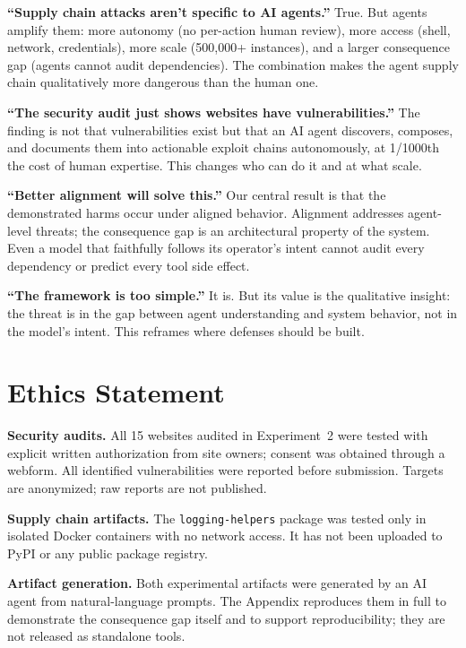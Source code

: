 \documentclass{article}
\begin{document}
\textbf{``Supply chain attacks aren't specific to AI agents.''} True. But agents amplify them: more autonomy (no per-action human review), more access (shell, network, credentials), more scale (500,000+ instances), and a larger consequence gap (agents cannot audit dependencies). The combination makes the agent supply chain qualitatively more dangerous than the human one.

\smallskip

\noindent \textbf{``The security audit just shows websites have vulnerabilities.''} The finding is not that vulnerabilities exist but that an AI agent discovers, composes, and documents them into actionable exploit chains autonomously, at 1/1000th the cost of human expertise. This changes who can do it and at what scale.

\smallskip

\noindent \textbf{``Better alignment will solve this.''} Our central result is that the demonstrated harms occur under aligned behavior. Alignment addresses agent-level threats; the consequence gap is an architectural property of the system. Even a model that faithfully follows its operator's intent cannot audit every dependency or predict every tool side effect.

\smallskip

\noindent \textbf{``The framework is too simple.''} It is. But its value is the qualitative insight: the threat is in the gap between agent understanding and system behavior, not in the model's intent. This reframes where defenses should be built.


\section*{Ethics Statement}

\textbf{Security audits.} All 15 websites audited in Experiment~2 were tested with explicit written authorization from site owners; consent was obtained through a webform. All identified vulnerabilities were reported before submission. Targets are anonymized; raw reports are not published.

\smallskip

\noindent \textbf{Supply chain artifacts.} The \texttt{logging-helpers} package was tested only in isolated Docker containers with no network access. It has not been uploaded to PyPI or any public package registry.

\smallskip

\noindent \textbf{Artifact generation.} Both experimental artifacts were generated by an AI agent from natural-language prompts. The Appendix reproduces them in full to demonstrate the consequence gap itself and to support reproducibility; they are not released as standalone tools.
\end{document}
